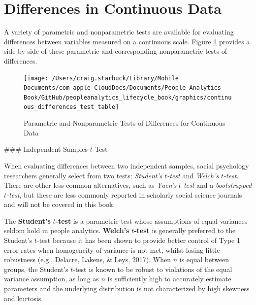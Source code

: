 \documentclass[]{book}
\begin{document}
\hypertarget{differences-in-continuous-data}{%
\section{Differences in Continuous Data}\label{differences-in-continuous-data}}

A variety of parametric and nonparametric tests are available for evaluating differences between variables measured on a continuous scale. Figure \ref{fig:continuous-tests} provides a side-by-side of these parametric and corresponding nonparametric tests of differences.

\begin{figure}

{\centering \texttt{[image: /Users/craig.starbuck/Library/Mobile Documents/com~apple~CloudDocs/Documents/People Analytics Book/GitHub/peopleanalytics\_lifecycle\_book/graphics/continuous\_differences\_test\_table]} 

}

\caption{Parametric and Nonparametric Tests of Differences for Continuous Data}\label{fig:continuous-tests}
\end{figure}

\#\#\# Independent Samples \(t\)-Test

When evaluating differences between two independent samples, social psychology researchers generally select from two tests: \emph{Student's} \(t\)\emph{-test} and \emph{Welch's} \(t\)\emph{-test}. There are other less common alternatives, such as \emph{Yuen's} \(t\)\emph{-test} and a \emph{bootstrapped} \(t\)\emph{-test}, but these are less commonly reported in scholarly social science journals and will not be covered in this book.

The \textbf{Student's} \(t\)\textbf{-test} is a parametric test whose assumptions of equal variances seldom hold in people analytics. \textbf{Welch's} \(t\)\textbf{-test} is generally preferred to the Student's \(t\)-test because it has been shown to provide better control of Type 1 error rates when homogeneity of variance is not met, whilst losing little robustness (e.g., Delacre, Lakens, \& Leys, 2017). When \(n\) is equal between groups, the Student's \(t\)-test is known to be robust to violations of the equal variance assumption, as long as \(n\) is sufficiently high to accurately estimate parameters and the underlying distribution is not characterized by high skewness and kurtosis.
\end{document}
